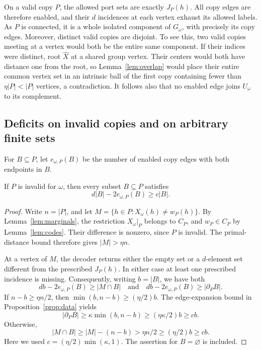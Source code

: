 On a valid copy $P$, the allowed port sets are exactly $J_P(h)$.
All copy edges are therefore enabled, and their $d$ incidences at each
vertex exhaust its allowed labels.  As $P$ is connected, it is a whole
isolated component of $G_\omega$, with precisely its copy edges.
Moreover, distinct valid copies are disjoint.  To see this, two valid
copies meeting at a vertex would both be the entire same component.
If their indices were distinct, root $\widehat X$ at a shared group
vertex.  Their centers would both have distance one from the root, so
Lemma~\ref{lem:overlap} would place their entire common vertex set in
an intrinsic ball of the first copy containing fewer than
$\eta|P|<|P|$ vertices, a contradiction.  It follows also that no enabled
edge joins $U_\omega$ to its complement.

\subsection{Deficits on invalid copies and on arbitrary finite sets}

For $B\subseteq P$, let $e_{\omega,P}(B)$ be the number of enabled
copy edges with both endpoints in $B$.

\begin{lemma}
\label{lem:local-deficit}
If $P$ is invalid for $\omega$, then every subset $B\subseteq P$ satisfies
\begin{equation}
 d|B|-2e_{\omega,P}(B)\ge c|B|.
 \label{eq:local-deficit}
\end{equation}
\end{lemma}

\begin{proof}
Write $n=|P|$, and let
$M=\{h\in P:X_\omega(h)\ne w_P(h)\}$.
By Lemma~\ref{lem:marginals}, the restriction $X_\omega|_P$ belongs to
$C_P$, and $w_P\in C_P$ by Lemma~\ref{lem:codes}.  Their difference is
nonzero, since $P$ is invalid.  The primal-distance bound therefore gives
$|M|>\eta n$.

At a vertex of $M$, the decoder returns either the empty set or a
$d$-element set different from the prescribed $J_P(h)$.  In either case
at least one prescribed incidence is missing.  Consequently, writing
$b=|B|$, we have both
\[
 db-2e_{\omega,P}(B)\ge |M\cap B|
 \quad\text{and}\quad
 db-2e_{\omega,P}(B)\ge |\partial_P B|.
\]
If $n-b\ge\eta n/2$, then
$\min(b,n-b)\ge(\eta/2)b$.  The edge-expansion bound in
Proposition~\ref{prop:data} yields
\[
 |\partial_P B|\ge\kappa\min(b,n-b)
 \ge(\eta\kappa/2)b\ge cb.
\]
Otherwise,
\[
 |M\cap B|\ge |M|-(n-b)>\eta n/2
 \ge(\eta/2)b\ge cb.
\]
Here we used $c=(\eta/2)\min(\kappa,1)$.  The assertion for $B=\varnothing$
is included.
\end{proof}

